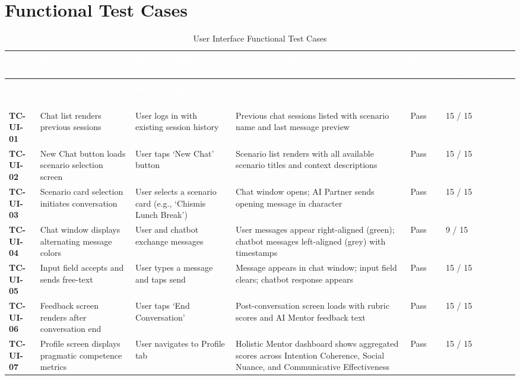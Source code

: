 \chapter{Functional Test Cases}
\label{sec:functional_test_cases}

\begin{longtable}{>{\bfseries}p{1.2cm} p{3.0cm} p{3.5cm} p{4.5cm} p{1.0cm} p{1.5cm}}
\caption{User Interface Functional Test Cases}
\label{tab:tc-ui} \\
 
\rowcolor{headerblue}
\textcolor{white}{\textbf{TC-UI}} &
\textcolor{white}{\textbf{Test Description}} &
\textcolor{white}{\textbf{Input / Trigger}} &
\textcolor{white}{\textbf{Expected Output}} &
\textcolor{white}{\textbf{Result}} &
\textcolor{white}{\textbf{Stress Test (Pass/Total)}} \\
\endfirsthead
 
\multicolumn{6}{c}{\tablename\ \thetable{} -- continued} \\
\rowcolor{headerblue}
\textcolor{white}{\textbf{TC-UI}} &
\textcolor{white}{\textbf{Test Description}} &
\textcolor{white}{\textbf{Input / Trigger}} &
\textcolor{white}{\textbf{Expected Output}} &
\textcolor{white}{\textbf{Result}} &
\textcolor{white}{\textbf{Stress Test (Pass/Total)}} \\
\endhead
 
\midrule
TC-UI-01 & Chat list renders previous sessions & User logs in with existing session history & Previous chat sessions listed with scenario name and last message preview & Pass & 15 / 15 \\
\midrule
TC-UI-02 & New Chat button loads scenario selection screen & User taps `New Chat' button & Scenario list renders with all available scenario titles and context descriptions & Pass & 15 / 15 \\
\midrule
TC-UI-03 & Scenario card selection initiates conversation & User selects a scenario card (e.g., `Chismis Lunch Break') & Chat window opens; AI Partner sends opening message in character & Pass & 15 / 15 \\
\midrule
TC-UI-04 & Chat window displays alternating message colors & User and chatbot exchange messages & User messages appear right-aligned (green); chatbot messages left-aligned (grey) with timestamps & Pass & 9 / 15 \\
\midrule
TC-UI-05 & Input field accepts and sends free-text & User types a message and taps send & Message appears in chat window; input field clears; chatbot response appears & Pass & 15 / 15 \\
\midrule
TC-UI-06 & Feedback screen renders after conversation end & User taps `End Conversation' & Post-conversation screen loads with rubric scores and AI Mentor feedback text & Pass & 15 / 15 \\
\midrule
TC-UI-07 & Profile screen displays pragmatic competence metrics & User navigates to Profile tab & Holistic Mentor dashboard shows aggregated scores across Intention Coherence, Social Nuance, and Communicative Effectiveness & Pass & 15 / 15 \\
\end{longtable}

